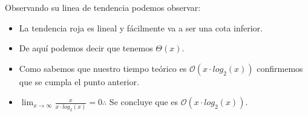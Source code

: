 \documentclass[letterpaper,11pt]{article}
\begin{document}
            Observando su linea de tendencia podemos observar:

            \begin{itemize}
                \item La tendencia roja es lineal y fácilmente va a ser una cota inferior.
                \item De aquí podemos decir que tenemos $\Theta(x)$.
                \item Como sabemos que nuestro tiempo teórico es $\mathcal{O}(x\cdot log_2(x))$ confirmemos que se cumpla el punto anterior.
                \item $\lim_{x \to \infty} \frac{x}{x\cdot log_2(x)} = 0 \therefore$ Se concluye que es $\mathcal{O}(x\cdot log_2(x))$.
            \end{itemize}
           
        \newpage 
\end{document}
